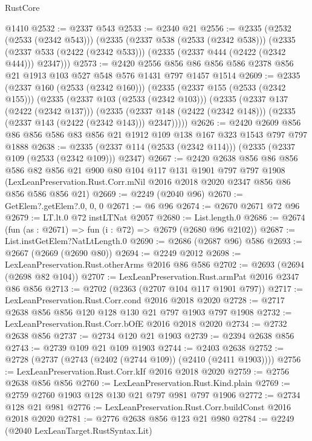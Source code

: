 \begin{lexlean}{RustCore}
\begin{coremodule}
    @1410
@2532 := @2337 @543
@2533 := @2340 @21
@2556 := @2335
    (@2532 (@2533 (@2342 @543)))
    (@2335
      (@2337 @538 (@2533 (@2342 @538)))
      (@2335 (@2337 @533 (@2422 (@2342 @533))) (@2335 (@2337 @444 (@2422 (@2342 @444))) @2347)))
@2573 := @2420
    @2556
    @856
    @86
    @856
    @586
    @2378
    @856
    @21
    @1913
    @103
    @527
    @548
    @576
    @1431
    @797
    @1457
    @1514
@2609 := @2335
    (@2337 @160 (@2533 (@2342 @160)))
    (@2335
      (@2337 @155 (@2533 (@2342 @155)))
      (@2335
        (@2337 @103 (@2533 (@2342 @103)))
        (@2335
          (@2337 @137 (@2422 (@2342 @137)))
          (@2335
            (@2337 @148 (@2422 (@2342 @148)))
            (@2335 (@2337 @143 (@2422 (@2342 @143))) @2347)))))
@2626 := @2420 @2609 @856 @86 @856 @586 @83 @856 @21 @1912 @109 @138 @167 @323 @1543 @797 @797 @1888
@2638 := @2335 (@2337 @114 (@2533 (@2342 @114))) (@2335 (@2337 @109 (@2533 (@2342 @109))) @2347)
@2667 := @2420
    @2638
    @856
    @86
    @856
    @586
    @82
    @856
    @21
    @900
    @80
    @104
    @117
    @131
    @1901
    @797
    @797
    @1908
    (LexLeanPreservation.Rust.Corr.mNil @2016 @2018 @2020 @2347 @856 @86 @856 @586 @856 @21)
@2669 := @2249 (@2040 @96)
@2670 := GetElem?.getElem?.{0, 0, 0}
@2671 := @6 @96
@2674 := @2670 @2671 @72 @96
@2679 := LT.lt.{0} @72 instLTNat @2057
@2680 := List.length.{0}
@2686 := @2674 (fun (as : @2671) => fun (i : @72) => @2679 (@2680 @96 @2102))
@2687 := List.instGetElem?NatLtLength.{0}
@2690 := @2686 (@2687 @96) @586
@2693 := @2667 (@2669 (@2690 @80))
@2694 := @2249 @2012
@2698 := LexLeanPreservation.Rust.otherArms @2016 @86 @586
@2702 := @2693 (@2694 (@2698 @82 @104))
@2707 := LexLeanPreservation.Rust.armPat @2016 @2347 @86 @856
@2713 := @2702 (@2363 (@2707 @104 @117 @1901 @797))
@2717 := LexLeanPreservation.Rust.Corr.cond @2016 @2018 @2020
@2728 := @2717 @2638 @856 @856 @120 @128 @130 @21 @797 @1903 @797 @1908
@2732 := LexLeanPreservation.Rust.Corr.bOfE @2016 @2018 @2020
@2734 := @2732 @2638 @856
@2737 := @2734 @120 @21 @1903
@2739 := @2394 @2638 @856
@2743 := @2739 @109 @21 @109 @1903
@2744 := @2403 @2638
@2752 := @2728 (@2737 (@2743 (@2402 (@2744 @109)) (@2410 (@2411 @1903))))
@2756 := LexLeanPreservation.Rust.Corr.kIf @2016 @2018 @2020
@2759 := @2756 @2638 @856 @856
@2760 := LexLeanPreservation.Rust.Kind.plain
@2769 := @2759 @2760 @1903 @128 @130 @21 @797 @981 @797 @1906
@2772 := @2734 @128 @21 @981
@2776 := LexLeanPreservation.Rust.Corr.buildConst @2016 @2018 @2020
@2781 := @2776 @2638 @856 @123 @21 @980
@2784 := @2249 (@2040 LexLeanTarget.RustSyntax.Lit)

\end{coremodule}
\end{lexlean}
